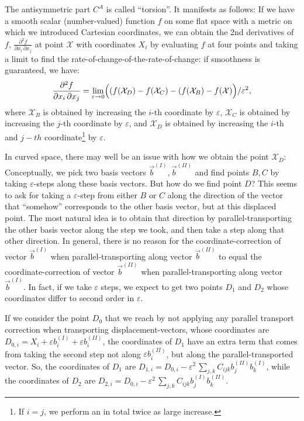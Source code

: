 \documentclass[twocolumn]{article}
\begin{document}
The antisymmetric part $C^A$ is called ``torsion''. It manifests as
follows: If we have a smooth scalar (number-valued) function $f$ on
some flat space with a metric on which we introduced Cartesian
coordinates, we can obtain the 2nd derivatives of $f$,
$\frac{\partial^2 f}{\partial x_i\,\partial x_j}$ at point
$\mathcal X$ with coordinates $X_i$ by evaluating $f$ at four
points and taking a limit to find the
rate-of-change-of-the-rate-of-change: if smoothness is guaranteed,
we have:
%
\begin{equation}
  \frac{\partial^2 f}{\partial x_i\,\partial x_j}=\lim_{\varepsilon\to 0}
  \Bigl(\left(f({\mathcal X}_D)-f({\mathcal X}_C\right)-
        \left(f({\mathcal X}_B)-f({\mathcal X}\right)
    \Bigr)/\varepsilon^2,
\end{equation}
where
${\mathcal X}_B$ is obtained by increasing the $i$-th coordinate by $\varepsilon$,
${\mathcal X}_C$ is obtained by increasing the $j$-th coordinate by $\varepsilon$,
and
${\mathcal X}_D$ is obtained by increasing the $i$-th and $j-th$
coordinate\footnote{If $i=j$, we perform an in total twice as large increase.}
by $\varepsilon$.

In curved space, there may well be an issue with how we obtain the
point ${\mathcal X}_D$: Conceptually, we pick two basis vectors
$\vec b^{(I)}, \vec b^{(II)}$ and find points $B, C$ by taking $\varepsilon$-steps
along these basis vectors. But how do we find point $D$? This seems to
ask for taking a $\varepsilon$-step from either $B$ or $C$ along the
direction of the vector that ``somehow'' corresponds to the other
basis vector, but at this displaced point. The most natural idea is to
obtain that direction by parallel-transporting the other basis vector
along the step we took, and then take a step along that other direction.
In general, there is no reason for the coordinate-correction of vector
$\vec b^{(I)}$ when parallel-transporting along vector $\vec b^{(II)}$ to equal
the coordinate-correction of vector $\vec b^{(II)}$ when parallel-transporting
along vector $\vec b^{(I)}$. In fact, if we take $\varepsilon$ steps, we expect
to get two points $D_1$ and $D_2$ whose coordinates differ to
second order in $\varepsilon$.

If we consider the point $D_0$ that we reach by not applying any
parallel transport correction when transporting displacement-vectors,
whose coordinates are $D_{0,i}=X_i+\varepsilon b^{(I)}_i+\varepsilon b^{(II)}_i$,
the coordinates of $D_1$ have an extra term that comes from taking the second
step not along $\varepsilon b^{(II)}_i$, but along the parallel-transported vector.
So, the coordinates of $D_1$ are $D_{1,i}=D_{0,i}-\varepsilon^2\,\sum_{j,k} C_{ijk}b^{(II)}_jb^{(I)}_k$,
while the coordinates of $D_2$ are $D_{2,i}=D_{0,i}-\varepsilon^2\,\sum_{j,k} C_{ijk}b^{(I)}_jb^{(II)}_k$.
\end{document}
